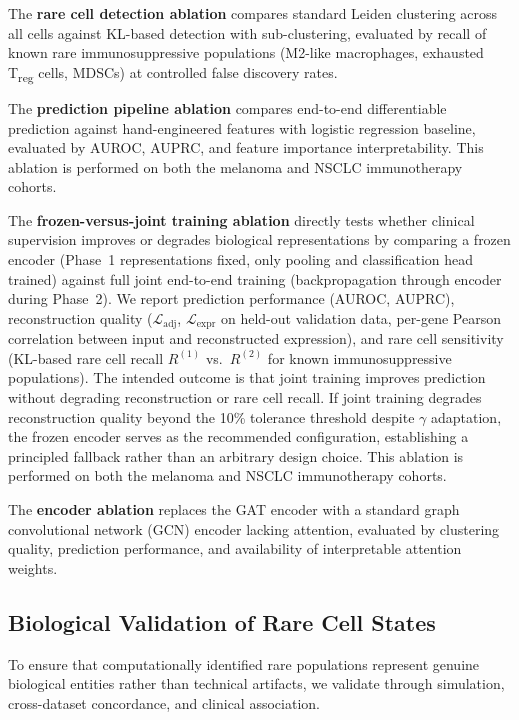 \documentclass{article}
\begin{document}
The \textbf{rare cell detection ablation} compares standard Leiden clustering across all cells against KL-based detection with sub-clustering, evaluated by recall of known rare immunosuppressive populations (M2-like macrophages, exhausted T\textsubscript{reg} cells, MDSCs) at controlled false discovery rates.

The \textbf{prediction pipeline ablation} compares end-to-end differentiable prediction against hand-engineered features with logistic regression baseline, evaluated by AUROC, AUPRC, and feature importance interpretability. This ablation is performed on both the melanoma and NSCLC immunotherapy cohorts.

The \textbf{frozen-versus-joint training ablation} directly tests whether clinical supervision improves or degrades biological representations by comparing a frozen encoder (Phase~1 representations fixed, only pooling and classification head trained) against full joint end-to-end training (backpropagation through encoder during Phase~2). We report prediction performance (AUROC, AUPRC), reconstruction quality ($\mathcal{L}_{\text{adj}}$, $\mathcal{L}_{\text{expr}}$ on held-out validation data, per-gene Pearson correlation between input and reconstructed expression), and rare cell sensitivity (KL-based rare cell recall $R^{(1)}$ vs.\ $R^{(2)}$ for known immunosuppressive populations). The intended outcome is that joint training improves prediction without degrading reconstruction or rare cell recall. If joint training degrades reconstruction quality beyond the 10\% tolerance threshold despite $\gamma$ adaptation, the frozen encoder serves as the recommended configuration, establishing a principled fallback rather than an arbitrary design choice. This ablation is performed on both the melanoma and NSCLC immunotherapy cohorts.

The \textbf{encoder ablation} replaces the GAT encoder with a standard graph convolutional network (GCN) encoder lacking attention, evaluated by clustering quality, prediction performance, and availability of interpretable attention weights.


\subsection{Biological Validation of Rare Cell States}

To ensure that computationally identified rare populations represent genuine biological entities rather than technical artifacts, we validate through simulation, cross-dataset concordance, and clinical association.
\end{document}
